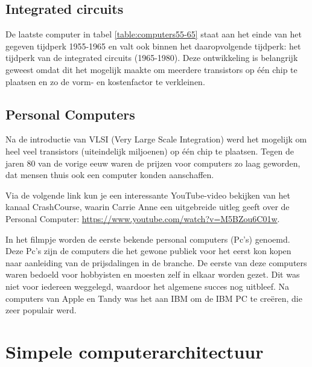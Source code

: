 \subsection{Integrated circuits}

De laatste computer in tabel \ref{table:computers55-65} staat aan het einde van het gegeven tijdperk 1955-1965 en valt ook binnen het daaropvolgende tijdperk: het tijdperk van de integrated circuits (1965-1980). Deze ontwikkeling is belangrijk geweest omdat dit het mogelijk maakte om meerdere transistors op één chip te plaatsen en zo de vorm- en kostenfactor te verkleinen.

\subsection{Personal Computers}

Na de introductie van VLSI (Very Large Scale Integration) werd het mogelijk om heel veel transistors (uiteindelijk miljoenen) op één chip te plaatsen. Tegen de jaren 80 van de vorige eeuw waren de prijzen voor computers zo laag geworden, dat mensen thuis ook een computer konden aanschaffen.

Via de volgende link kun je een interessante YouTube-video bekijken van het kanaal CrashCourse, waarin Carrie Anne een uitgebreide uitleg geeft over de Personal Computer: {\color{blue} \url{https://www.youtube.com/watch?v=M5BZou6C01w}}.

In het filmpje worden de eerste bekende personal computers (Pc's) genoemd. Deze Pc's zijn de computers die het gewone publiek voor het eerst kon kopen naar aanleiding van de prijsdalingen in de branche. De eerste van deze computers waren bedoeld voor hobbyisten en moesten zelf in elkaar worden gezet. Dit was niet voor iedereen weggelegd, waardoor het algemene succes nog uitbleef. Na computers van Apple en Tandy was het aan IBM om de IBM PC te creëren, die zeer populair werd.

\section{Simpele computerarchitectuur}


